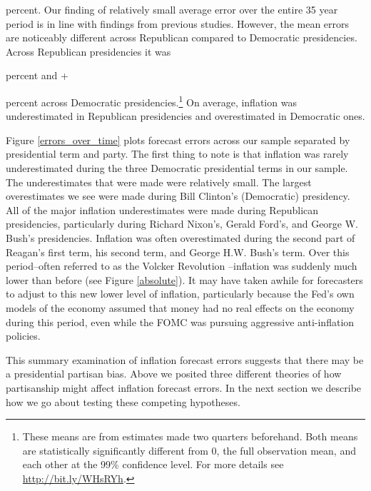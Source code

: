 \documentclass[a4paper]{article}
\begin{document}
{\ttfamily\noindent\bfseries\color{errorcolor}{\\Error in mean(cpi.data\$error.prop.deflator.q2, na.rm = TRUE) : \\\ \ object 'cpi.data' not found}} percent. Our finding of relatively small average error over the entire 35 year period is in line with findings from previous studies. However, the mean errors are noticeably different across Republican compared to Democratic presidencies. Across Republican presidencies it was 

{\ttfamily\noindent\bfseries\color{errorcolor}{\\Error in eval(expr, envir, enclos) : object 'RepMean' not found}} percent and +

{\ttfamily\noindent\bfseries\color{errorcolor}{\\Error in eval(expr, envir, enclos) : object 'DemMean' not found}} percent across Democratic presidencies.\footnote{These means are from estimates made two quarters beforehand. Both means are statistically significantly different from 0, the full observation mean, and each other at the 99\% confidence level. For more details see \url{http://bit.ly/WHsRYh}.} On average, inflation was underestimated in Republican presidencies and overestimated in Democratic ones.

Figure \ref{errors_over_time} plots forecast errors across our sample separated by presidential term and party. The first thing to note is that inflation was rarely underestimated during the three Democratic presidential terms in our sample. The underestimates that were made were relatively small. The largest overestimates we see were made during Bill Clinton's (Democratic) presidency. All of the major inflation underestimates were made during Republican presidencies, particularly during Richard Nixon's, Gerald Ford's, and George W. Bush's presidencies. Inflation was often overestimated during the second part of Reagan's first term, his second term, and George H.W. Bush's term. Over this period--often referred to as the Volcker Revolution \citep{Bartels1985}--inflation was suddenly much lower than before (see Figure \ref{absolute}). It may have taken awhile for forecasters to adjust to this new lower level of inflation, particularly because the Fed's own models of the economy assumed that money had no real effects on the economy during this period, even while the FOMC was pursuing aggressive anti-inflation policies.

This summary examination of inflation forecast errors suggests that there may be a presidential partisan bias. Above we posited three different theories of how partisanship might affect inflation forecast errors. In the next section we describe how we go about testing these competing hypotheses.
\end{document}

